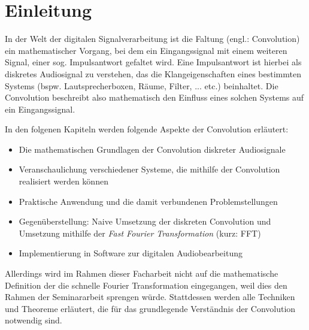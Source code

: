 \chapter{Einleitung}
\label{chapt:intro}

In der Welt der digitalen Signalverarbeitung ist die Faltung (engl.: \glqq Convolution\grqq) ein mathematischer Vorgang, bei dem 
ein Eingangssignal mit einem weiteren Signal, einer sog. Impulsantwort gefaltet wird.
Eine Impulsantwort ist hierbei als diskretes Audiosignal zu verstehen, das die Klangeigenschaften
eines bestimmten Systems (bspw. Lautsprecherboxen, Räume, Filter, ... etc.) beinhaltet.
Die Convolution beschreibt also mathematisch den Einfluss eines solchen Systems auf ein Eingangssignal.\cite[Kapitel 5]{lyons2010}

In den folgenen Kapiteln werden folgende Aspekte der Convolution erläutert:
\begin{itemize}
    \item Die mathematischen Grundlagen der Convolution diskreter Audiosignale
    \item Veranschaulichung verschiedener Systeme, die mithilfe der Convolution realisiert werden können
    \item Praktische Anwendung und die damit verbundenen Problemstellungen
    \item Gegenüberstellung: Naive Umsetzung der diskreten Convolution und Umsetzung mithilfe der \textit{Fast Fourier Transformation} (kurz: FFT)
    \item Implementierung in Software zur digitalen Audiobearbeitung
\end{itemize}

Allerdings wird im Rahmen dieser Facharbeit nicht auf die mathematische Definition der
die schnelle Fourier Transformation eingegangen, weil dies den Rahmen der Seminararbeit sprengen würde.
Stattdessen werden alle Techniken und Theoreme erläutert, die für das grundlegende
Verständnis der Convolution notwendig sind.